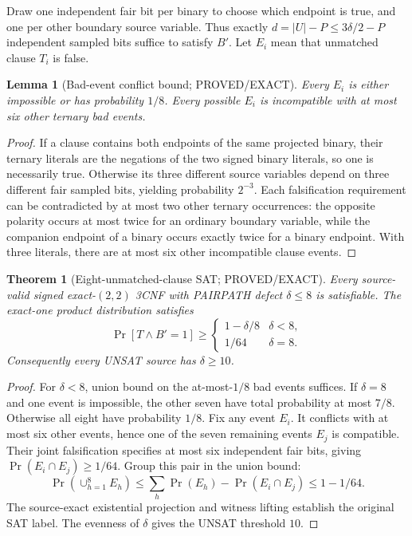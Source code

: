 \documentclass[11pt]{article}
\newtheorem{theorem}{Theorem}
\newtheorem{lemma}{Lemma}
\begin{document}
Draw one independent fair bit per binary to choose which endpoint is true, and one per other boundary source variable. Thus exactly $d=|U|-P\le3\delta/2-P$ independent sampled bits suffice to satisfy $B'$. Let $E_i$ mean that unmatched clause $T_i$ is false.
\begin{lemma}[Bad-event conflict bound; PROVED/EXACT]
Every $E_i$ is either impossible or has probability $1/8$. Every possible $E_i$ is incompatible with at most six other ternary bad events.
\end{lemma}
\begin{proof}
If a clause contains both endpoints of the same projected binary, their ternary literals are the negations of the two signed binary literals, so one is necessarily true. Otherwise its three different source variables depend on three different fair sampled bits, yielding probability $2^{-3}$. Each falsification requirement can be contradicted by at most two other ternary occurrences: the opposite polarity occurs at most twice for an ordinary boundary variable, while the companion endpoint of a binary occurs exactly twice for a binary endpoint. With three literals, there are at most six other incompatible clause events.
\end{proof}
\begin{theorem}[Eight-unmatched-clause SAT; PROVED/EXACT]
Every source-valid signed exact-$(2,2)$ 3CNF with PAIRPATH defect $\delta\le8$ is satisfiable. The exact-one product distribution satisfies
\[
\boxed{\Pr[T\land B'=1]\ge\begin{cases}1-\delta/8&\delta<8,\\1/64&\delta=8.\end{cases}}
\]
Consequently every UNSAT source has $\delta\ge10$.
\end{theorem}
\begin{proof}
For $\delta<8$, union bound on the at-most-$1/8$ bad events suffices. If $\delta=8$ and one event is impossible, the other seven have total probability at most $7/8$. Otherwise all eight have probability $1/8$. Fix any event $E_i$. It conflicts with at most six other events, hence one of the seven remaining events $E_j$ is compatible. Their joint falsification specifies at most six independent fair bits, giving $\Pr(E_i\cap E_j)\ge1/64$. Group this pair in the union bound:
\[
\Pr(\cup_{h=1}^8 E_h)\le\sum_h\Pr(E_h)-\Pr(E_i\cap E_j)\le1-1/64.
\]
The source-exact existential projection and witness lifting establish the original SAT label. The evenness of $\delta$ gives the UNSAT threshold $10$.
\end{proof}
\end{document}
